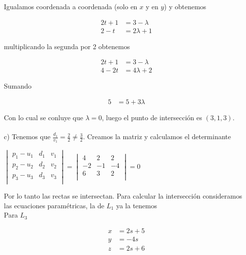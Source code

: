 \documentclass{article}
\theoremstyle{definition}
\begin{document}
Igualamos coordenada a coordenada (solo en $x$ y en $y$) y obtenemos


\begin{align*}
    2t+1 &= 3-\lambda \\
    2-t &= 2\lambda+1
\end{align*}

multiplicando la segunda por 2 obtenemos

\begin{align*}
    2t+1 &= 3-\lambda \\
    4-2t &= 4\lambda+2
\end{align*}

Sumando

\begin{align*}
5 &= 5+3\lambda
\end{align*}

Con lo cual se conluye que $\lambda=0$, luego el punto de intersección es $(3,1,3)$. \\ \\

c) Tenemos que $\displaystyle \frac{d_1}{v_1} = \frac{2}{2}\neq \frac{3}{2}$. Creamos la matriz y calculamos el determinante 

\begin{center}
$\displaystyle \begin{vmatrix}
p_1-u_1 & d_1 & v_1 \\
p_2-u_2 & d_2 & v_2 \\
p_3-u_3 & d_3 & v_3 \\
\end{vmatrix} = \displaystyle \begin{vmatrix}
4 & 2 & 2 \\
-2 & -1 & -4 \\
6 & 3 & 2 \\
\end{vmatrix} = 0$
\end{center}


Por lo tanto las rectas se intersectan. Para calcular la intersección consideramos las ecuaciones paramétricas, la de $L_1$ ya la tenemos \\

Para $L_3$

\begin{align*}
    x &= 2s+5 \\
    y &= -4s \\
    z &= 2s+6 \\
\end{align*}
\end{document}
